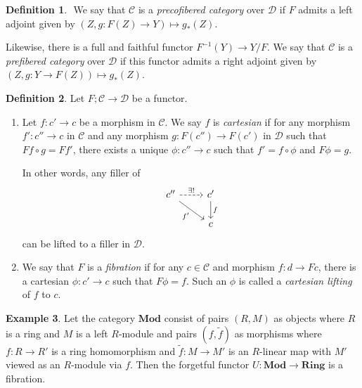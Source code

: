 \documentclass[10pt,letterpaper,cm]{nupset}
\theoremstyle{definition}
\newtheorem{definition}{Definition}[section]
\newtheorem{exmp}[definition]{Example}
\theoremstyle{theorem}
\theoremstyle{remark}
\newcommand{\1}{\mathbf{1}}
\renewcommand{\c}{\mathscr{C}}
\renewcommand{\d}{\mathscr{D}}
\newcommand{\0}{\vec 0}
\begin{document}
\begin{definition} $ $
We say that $\c$ is a \textit{precofibered category} over $\d$ if $F$ admits a left adjoint given by $\left(Z, g: F(Z) \to Y\right) \mapsto g_{\ast}(Z)$.
\end{definition}

Likewise, there is a full and faithful functor $F^{{-1}}(Y) \to Y/F$. We say that $\c$ is a \textit{prefibered category} over $\d$ if this functor admits a right adjoint given by $\left(Z, g: Y \to F(Z)\right) \mapsto g_{\ast}(Z)$.

\begin{definition}  Let $F ; \c \to \d$ be a functor.
\begin{enumerate}
\item Let $f: c' \to c$ be a morphism in $\c$. We say $f$ is \textit{cartesian} if for any morphism $f' : c'' \to c$ in $\c$ and any morphism $g : F(c'') \to F(c')$ in $\d$ such that $Ff \circ g = Ff'$, there exists a unique $\phi : c'' \to c$ such that $f' = f \circ \phi$ and $F\phi = g$.

 In other words, any filler of
\[ \begin{tikzcd}
c'' \arrow[r, dashed, "\exists!"] \arrow[swap, dr,  " f' "] & c' \arrow[d, "f"] \\%
 & c
\end{tikzcd}
\] can be lifted to a filler in $\d$.
\item We say that $F$ is a \textit{fibration} if for any $c \in \c$ and morphism $f: d \to Fc$, there is a cartesian $\phi : c' \to c$ such that $F\phi =f$. Such an $\phi$ is called a \textit{cartesian lifting} of $f$ to $c$.
\end{enumerate}
\end{definition}


\begin{exmp}
Let the category $\mathbf{Mod}$ consist of pairs $\left(R, M\right)$ as objects where  $R$ is a ring and $M$ is a left $R$-module and pairs $\left(f, \tilde{f}\right)$ as morphisms where $f: R \to R'$ is a ring homomorphism and $\tilde{f}: M \to M'$ is an $R$-linear map with $M'$ viewed as an $R$-module via $f$. Then the forgetful functor $U: \mathbf{Mod} \to \mathbf{Ring}$ is a fibration.
\end{exmp}
\end{document}
